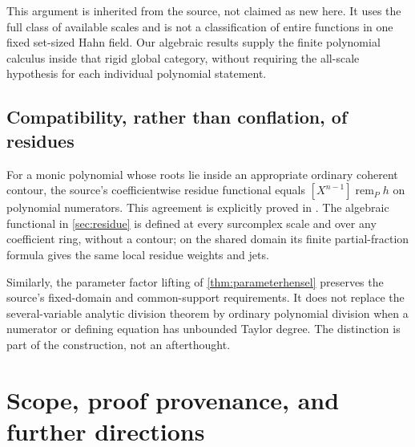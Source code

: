 \documentclass[11pt,letterpaper]{article}
\numberwithin{equation}{section}
\theoremstyle{definition}
\theoremstyle{remark}
\newcommand{\remp}{\operatorname{rem}}
\begin{document}
This argument is inherited from the source, not claimed as new here. It
uses the full class of available scales and is not a classification of
entire functions in one fixed set-sized Hahn field. Our algebraic results
supply the finite polynomial calculus inside that rigid global category,
without requiring the all-scale hypothesis for each individual
polynomial statement.

\subsection{Compatibility, rather than conflation, of residues}
For a monic polynomial whose roots lie inside an appropriate ordinary
coherent contour, the source's coefficientwise residue functional equals
$[X^{n-1}]\remp_P h$ on polynomial numerators. This agreement is explicitly
proved in \cite{SourceResearch}. The algebraic functional in
\cref{sec:residue} is defined at every surcomplex scale and over any
coefficient ring, without a contour; on the shared domain its finite
partial-fraction formula gives the same local residue weights and jets.

Similarly, the parameter factor lifting of \cref{thm:parameterhensel}
preserves the source's fixed-domain and common-support requirements.
It does not replace the several-variable analytic division theorem by
ordinary polynomial division when a numerator or defining equation has
unbounded Taylor degree. The distinction is part of the construction,
not an afterthought.

\section{Scope, proof provenance, and further directions}\label{sec:scope}
\end{document}

